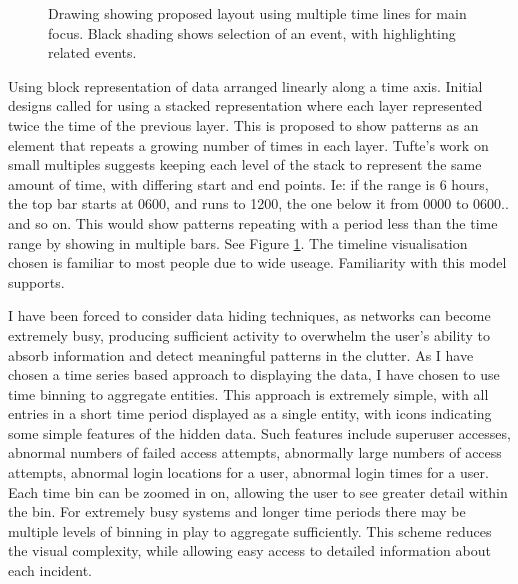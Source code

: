 \begin{figure}[tbh]
\caption{\protect\label{lines}Drawing showing proposed layout using multiple time lines for main focus. Black shading shows selection of an event, with highlighting related events.}
\end{figure}

Using block representation of data arranged linearly along a time axis.
Initial designs called for using a stacked representation where each layer represented twice the time of the previous layer. This is proposed to show patterns as an element that repeats a growing number of times in each layer.
Tufte's work on small multiples \cite{tufte1983visual} suggests keeping each level of the stack to represent the same amount of time, with differing start and end points. Ie: if the range is 6 hours, the top bar starts at 0600, and runs to 1200, the one below it from 0000 to 0600..  and so on. This would show patterns repeating with a period less than the time range by showing in multiple bars. See Figure \ref{lines}. The timeline visualisation chosen is familiar to most people due to wide useage. Familiarity with this model supports. 

I have been forced to consider data hiding techniques, as networks can become extremely busy, producing sufficient activity to overwhelm the user's ability to absorb information and detect meaningful patterns in the clutter. As I have chosen a time series based approach to displaying the data, I have chosen to use time binning to aggregate entities. This approach is extremely simple, with all entries in a short time period displayed as a single entity, with icons indicating some simple features of the hidden data. Such features include superuser accesses, abnormal numbers of failed access attempts, abnormally large numbers of access attempts, abnormal login locations for a user, abnormal login times for a user. Each time bin can be zoomed in on, allowing the user to see greater detail within the bin. For extremely busy systems and longer time periods there may be multiple levels of binning in play to aggregate sufficiently. This scheme reduces the visual complexity, while allowing easy access to detailed information about each incident. 

